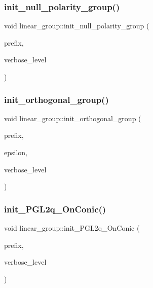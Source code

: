 \subsubsection{\texorpdfstring{init\+\_\+null\+\_\+polarity\+\_\+group()}{init\_null\_polarity\_group()}}
{\footnotesize\ttfamily void linear\+\_\+group\+::init\+\_\+null\+\_\+polarity\+\_\+group (\begin{DoxyParamCaption}\item[{\mbox{\hyperlink{galois_8h_ab6cc7b4aeb6ea31aba2b3fbfc83ff5e6}{B\+Y\+TE}} $\ast$}]{prefix,  }\item[{\mbox{\hyperlink{galois_8h_a09fddde158a3a20bd2dcadb609de11dc}{I\+NT}}}]{verbose\+\_\+level }\end{DoxyParamCaption})}

\mbox{\label{classlinear__group_a5a8f2a7cd8b33a9dfc626074726a58c4}} 
\subsubsection{\texorpdfstring{init\+\_\+orthogonal\+\_\+group()}{init\_orthogonal\_group()}}
{\footnotesize\ttfamily void linear\+\_\+group\+::init\+\_\+orthogonal\+\_\+group (\begin{DoxyParamCaption}\item[{\mbox{\hyperlink{galois_8h_ab6cc7b4aeb6ea31aba2b3fbfc83ff5e6}{B\+Y\+TE}} $\ast$}]{prefix,  }\item[{\mbox{\hyperlink{galois_8h_a09fddde158a3a20bd2dcadb609de11dc}{I\+NT}}}]{epsilon,  }\item[{\mbox{\hyperlink{galois_8h_a09fddde158a3a20bd2dcadb609de11dc}{I\+NT}}}]{verbose\+\_\+level }\end{DoxyParamCaption})}

\mbox{\label{classlinear__group_a84c4d6e1849da4c6f8f096a1af2a8270}} 
\subsubsection{\texorpdfstring{init\+\_\+\+P\+G\+L2q\+\_\+\+On\+Conic()}{init\_PGL2q\_OnConic()}}
{\footnotesize\ttfamily void linear\+\_\+group\+::init\+\_\+\+P\+G\+L2q\+\_\+\+On\+Conic (\begin{DoxyParamCaption}\item[{\mbox{\hyperlink{galois_8h_ab6cc7b4aeb6ea31aba2b3fbfc83ff5e6}{B\+Y\+TE}} $\ast$}]{prefix,  }\item[{\mbox{\hyperlink{galois_8h_a09fddde158a3a20bd2dcadb609de11dc}{I\+NT}}}]{verbose\+\_\+level }\end{DoxyParamCaption})}

